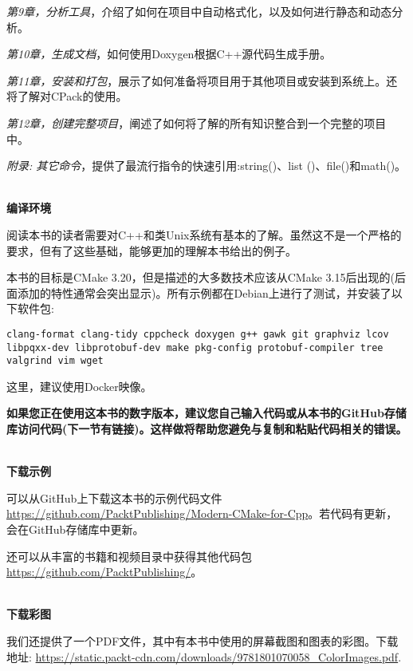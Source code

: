 \textit{第9章，分析工具}，介绍了如何在项目中自动格式化，以及如何进行静态和动态分析。

\textit{第10章，生成文档}，如何使用Doxygen根据C++源代码生成手册。

\textit{第11章，安装和打包}，展示了如何准备将项目用于其他项目或安装到系统上。还将了解对CPack的使用。

\textit{第12章，创建完整项目}，阐述了如何将了解的所有知识整合到一个完整的项目中。

\textit{附录: 其它命令}，提供了最流行指令的快速引用:string()、list ()、file()和math()。

\hspace*{\fill} \\ %
\textbf{编译环境}

阅读本书的读者需要对C++和类Unix系统有基本的了解。虽然这不是一个严格的要求，但有了这些基础，能够更加的理解本书给出的例子。

本书的目标是CMake 3.20，但是描述的大多数技术应该从CMake 3.15后出现的(后面添加的特性通常会突出显示)。所有示例都在Debian上进行了测试，并安装了以下软件包:

\texttt{clang-format clang-tidy cppcheck doxygen g++ gawk git graphviz lcov libpqxx-dev libprotobuf-dev make pkg-config protobuf-compiler tree valgrind vim wget}

这里，建议使用Docker映像。

\textbf{如果您正在使用这本书的数字版本，建议您自己输入代码或从本书的GitHub存储库访问代码(下一节有链接)。这样做将帮助您避免与复制和粘贴代码相关的错误。}

\hspace*{\fill} \\ %
\textbf{下载示例}

可以从GitHub上下载这本书的示例代码文件 \url{https://github.com/PacktPublishing/Modern-CMake-for-Cpp}。若代码有更新，会在GitHub存储库中更新。

还可以从丰富的书籍和视频目录中获得其他代码包\url{https://github.com/PacktPublishing/}。


\hspace*{\fill} \\ %
\textbf{下载彩图}

我们还提供了一个PDF文件，其中有本书中使用的屏幕截图和图表的彩图。下载地址: \url{https://static.packt-cdn.com/downloads/9781801070058_ColorImages.pdf}.










